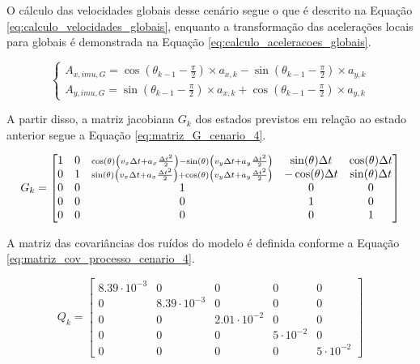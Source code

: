 \documentclass[acronym, symbols, table]{fei}
\begin{document}
			O cálculo das velocidades globais desse cenário segue o que é descrito na Equação \ref{eq:calculo_velocidades_globais}, enquanto a transformação das acelerações locais para globais é demonstrada na Equação \ref{eq:calculo_aceleracoes_globais}.
			
			\begin{equation}\label{eq:calculo_aceleracoes_globais}
				\begin{cases}
					A_{x,imu,G} = \cos(\theta_{k-1} - \frac{\pi}{2}) \times a_{x,k} - \sin(\theta_{k-1} - \frac{\pi}{2}) \times a_{y,k} \\
					A_{y,imu,G} = \sin(\theta_{k-1} - \frac{\pi}{2}) \times a_{x,k} + \cos(\theta_{k-1} - \frac{\pi}{2}) \times a_{y,k}
				\end{cases}
			\end{equation}
		
			A partir disso, a matriz jacobiana $G_{k}$ dos estados previstos em relação ao estado anterior segue a Equação \ref{eq:matriz_G_cenario_4}.
			
			\renewcommand{\arraystretch}{1.2}
			\begin{equation}\label{eq:matriz_G_cenario_4}
				G_k = 
				\begin{bmatrix}
					1 & 0 & 
					\smash{\scriptstyle 
						\cos(\theta)\left( v_x \Delta t + a_x \frac{\Delta t^2}{2} \right) 
						- \sin(\theta)\left( v_y \Delta t + a_y \frac{\Delta t^2}{2} \right)} 
					& \sin(\theta) \Delta t 
					& \cos(\theta) \Delta t 
					\\
					0 & 1 & 
					\smash{\scriptstyle 
						\sin(\theta)\left( v_x \Delta t + a_x \frac{\Delta t^2}{2} \right) 
						+ \cos(\theta)\left( v_y \Delta t + a_y \frac{\Delta t^2}{2} \right)} 
					& -\cos(\theta) \Delta t 
					& \sin(\theta) \Delta t 
					\\
					0 & 0 & 1 & 0 & 0 \\
					0 & 0 & 0 & 1 & 0 \\
					0 & 0 & 0 & 0 & 1 \\
				\end{bmatrix}
			\end{equation}
		
			A matriz das covariâncias dos ruídos do modelo é definida conforme a Equação \ref{eq:matriz_cov_processo_cenario_4}.
		
			\begin{equation}\label{eq:matriz_cov_processo_cenario_4}
				Q_{k} = \begin{bmatrix}
					8.39\cdot10^{-3} & 0 & 0 & 0 & 0 \\
					0 & 8.39\cdot10^{-3} & 0 & 0 & 0 \\
					0 & 0 & 2.01\cdot10^{-2} & 0 & 0 \\
					0 & 0 & 0 & 5\cdot10^{-2} & 0 \\
					0 & 0 & 0 & 0 & 5\cdot10^{-2}
				\end{bmatrix}
			\end{equation}
\end{document}
